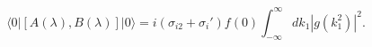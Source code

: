 \begin{equation}
\langle 0|  [A(\lambda), B(\lambda)] |0 \rangle 
 = i (\sigma_{i2}+ \sigma_i') f(0) \int_{-\infty} ^\infty dk_1 |g(k_1^2)|^2 .
\label{limitvecor}
\end{equation}

